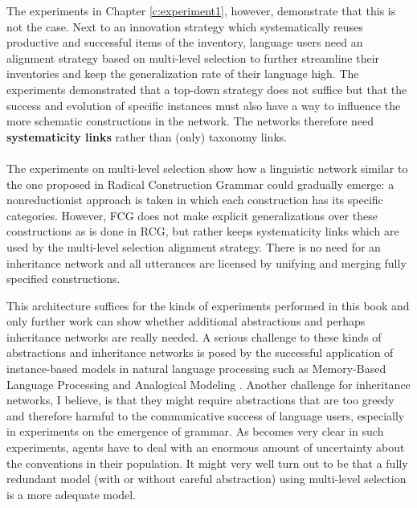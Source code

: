 The experiments in Chapter \ref{c:experiment1}, however, demonstrate that this is not the case. Next to an innovation strategy which systematically reuses productive and successful items of the inventory, language users need an alignment strategy based on multi-level selection to further streamline their inventories and keep the generalization rate of their language high. The experiments demonstrated that a top-down strategy does not suffice but that the success and evolution of specific instances must also have a way to influence the more schematic constructions in the network. The networks therefore need {\bfseries systematicity links} rather than (only) taxonomy links.
\\
\\
 The experiments on multi-level selection show how a linguistic network similar to the one proposed in Radical Construction Grammar could gradually emerge: a nonreductionist approach is taken in which each construction has its specific categories. However, FCG does not make explicit generalizations over these constructions as is done in RCG, but rather keeps systematicity links which are used by the multi-level selection alignment strategy. There is no need for an inheritance network and all utterances are licensed by unifying and merging fully specified constructions.

This architecture suffices for the kinds of experiments performed in this book and only further work can show whether additional abstractions and perhaps inheritance networks are really needed. A serious challenge to these kinds of abstractions and inheritance networks is posed by the successful application of instance-based models in natural language processing such as Memory-Based Language Processing \citep{daelemans05memory} and Analogical Modeling \citep{skousen89analogical}. Another challenge for inheritance networks, I believe, is that they might require abstractions that are too greedy and therefore harmful to the communicative success of language users, especially in experiments on the emergence of grammar. As becomes very clear in such experiments, agents have to deal with an enormous amount of uncertainty about the conventions in their population. It might very well turn out to be that a fully redundant model (with or without careful abstraction) using multi-level selection is a more adequate model.

